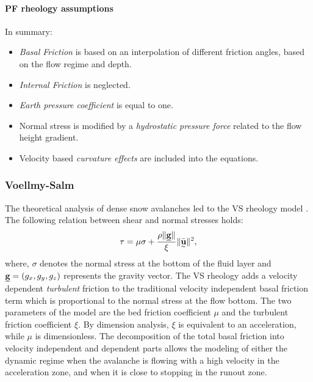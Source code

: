 \documentclass{article}
\begin{document}
\paragraph{PF rheology assumptions} In summary:
\begin{itemize}
\item \textit{Basal Friction} is based on an interpolation of different friction angles, based on the flow regime and depth.

\item \textit{Internal Friction} is neglected.

\item \textit{Earth pressure coefficient} is equal to one.

\item Normal stress is modified by a \textit{hydrostatic pressure force} related to the flow height gradient.

\item Velocity based \textit{curvature effects} are included into the equations.
\end{itemize}

\subsubsection{Voellmy-Salm}\label{VSM}
The theoretical analysis of dense snow avalanches led to the VS rheology model \citep{Voellmy1955, Salm1993}. The following relation between shear and normal stresses holds:
\begin{equation}
\tau = \mu \sigma + \frac{\rho \| \underline{\textbf g} \|}{\xi} \| \underset{^\sim}{\bar{\textbf u}} \|^2,
\end{equation}
where, $\sigma$ denotes the normal stress at the bottom of the fluid layer and $\underline{\textbf g} = (g_{x} , g_{y} , g_{z})$ represents the gravity vector. The VS rheology adds a velocity dependent \emph{turbulent} friction to the traditional velocity independent basal friction term which is proportional to the normal stress at the flow bottom. The two parameters of the model are the bed friction coefficient $\mu$ and the turbulent friction coefficient $\xi$. By dimension analysis, $\xi$ is equivalent to an acceleration, while $\mu$ is dimensionless. The decomposition of the total basal friction into velocity independent and dependent parts allows the modeling of either the dynamic regime when the avalanche is flowing with a high velocity in the acceleration zone, and when it is close to stopping in the runout zone.
\end{document}

